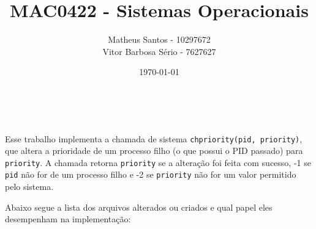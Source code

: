 \documentclass[12pt, a4paper]{article}
\title{MAC0422 - Sistemas Operacionais}
\author{Matheus Santos - 10297672 \\ Vitor Barbosa Sério - 7627627}
\date{\today}
\begin{document}
\makeatletter
\begin{flushright}
\@date
\end{flushright}
\begin{center}
{\Large \@title \\}
{\large \@author}
\end{center}
\makeatother

Esse trabalho implementa a chamada de sistema \texttt{chpriority(pid, priority)}, que altera a prioridade de um processo filho (o que possui o PID passado) para \texttt{priority}. A chamada retorna \texttt{priority} se a alteração foi feita com sucesso, -1 se \texttt{pid} não for de um processo filho e -2 se \texttt{priority} não for um valor permitido pelo sistema.

Abaixo segue a lista dos arquivos alterados ou criados e qual papel eles desempenham na implementação:
\end{document}
